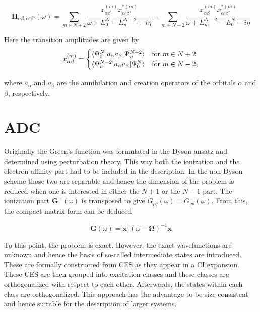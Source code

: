 \begin{equation}
\mathbf{\Pi}_{\alpha\beta,\alpha'\beta'}(\omega) = \sum\limits_{m\in N+2} \frac{x^{(m)}_{\alpha\beta}x^{*(m)}_{\alpha'\beta'}}{\omega +E_0^N-E_n^{N+2}+i\eta} - \sum\limits_{m\in N-2} \frac{x^{(m)}_{\alpha\beta}x^{*(m)}_{\alpha'\beta'}}{\omega +E_m^{N-2}-E_0^{N}-i\eta}
\end{equation}

Here the transition amplitudes are given by
\begin{equation}
x^{(m)}_{\alpha\beta}=\begin{cases}
\braket{\Psi_0^N|a_\alpha a_\beta|\Psi_n^{N+2}} & \text{for } m\in N+2\\
\braket{\Psi_n^{N-2}|a_\alpha a_\beta|\Psi_0^{N}} & \text{for } m\in N-2,
\end{cases}
\end{equation}

where $a_\alpha$ and $a_\beta$ are the annihilation and creation operators of
the orbitals $\alpha$ and $\beta$, respectively.



\section{\acl{ADC}}
Originally the Green's function was formulated in the Dyson ansatz and
determined using perturbation theory. This way both the ionization and the
electron affinity part had to be included in the description. In the non-Dyson
scheme those two are separable and hence the dimension of the problem is reduced
when one is interested in either the $N+1$ or the $N-1$ part. \cite{Schirmer98}
The ionization part $\mathbf{G^-}(\omega)$ is transposed to give
$\tilde{G}_{pq}(\omega) = G^-_{qp}(\omega)$. From this, the compact matrix
form can be deduced

\begin{equation}\label{matrixspec}
\mathbf{\tilde{G}}(\omega) = \mathbf{x}^\dagger(\omega-\mathbf{\Omega})^{-1}\mathbf{x}
\end{equation}

To this point, the problem is exact. However, the exact wavefunctions are unknown
and hence the basis of so-called intermediate states are introduced. These
are formally constructed from \ac{CES} as they appear in a
\ac{CI} expansion. These \ac{CES} are then grouped into excitation classes
and these classes are orthogonalized with respect to each other. Afterwards,
the states within each class are orthogonalized. 
This approach has the advantage to be size-consistent and hence
suitable for the description of larger systems. \cite{Mertins96_1}

